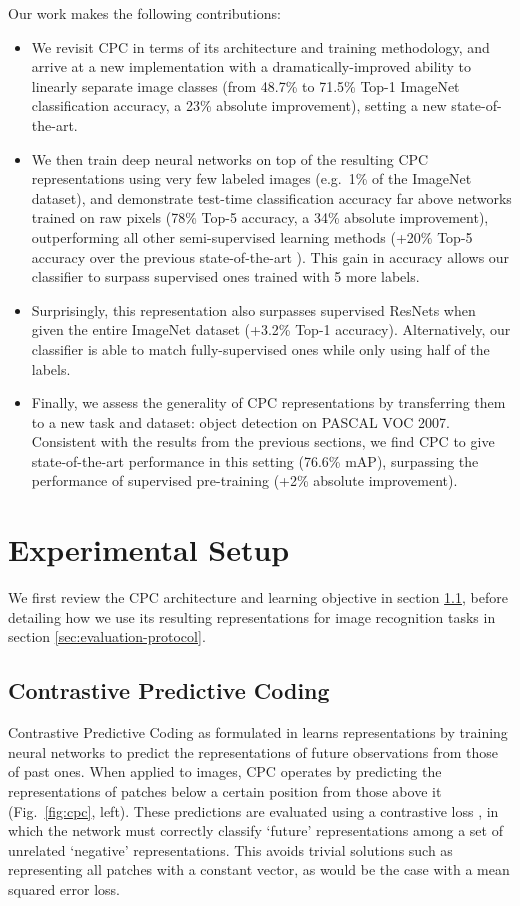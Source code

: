 \documentclass{article}
\begin{document}
Our work makes the following contributions:
\begin{itemize}
    \item We revisit CPC in terms of its architecture and training methodology, and arrive at a new implementation with a dramatically-improved ability to linearly separate image classes (from 48.7\% to 71.5\% Top-1 ImageNet classification accuracy, a 23\% absolute improvement), setting a new state-of-the-art. 
    \item We then train deep neural networks on top of the resulting CPC representations using very few labeled images (e.g.\ 1\% of the ImageNet dataset), and demonstrate test-time classification accuracy far above networks trained on raw pixels (78\% Top-5 accuracy, a 34\% absolute improvement), outperforming all other semi-supervised learning methods (+20\% Top-5 accuracy over the previous state-of-the-art \citep{zhai2019s}). This gain in accuracy allows our classifier to surpass supervised ones trained with 5 more labels. 
    \item Surprisingly, this representation also surpasses supervised ResNets when given the entire ImageNet dataset (+3.2\% Top-1 accuracy). Alternatively, our classifier is able to match fully-supervised ones while only using half of the labels.
    \item Finally, we assess the generality of CPC representations by transferring them to a new task and dataset: object detection on PASCAL VOC 2007. Consistent with the results from the previous sections, we find CPC to give state-of-the-art performance in this setting (76.6\% mAP), surpassing the performance of supervised pre-training (+2\% absolute improvement). 
\end{itemize}


\section{Experimental Setup}

We first review the CPC architecture and learning objective in section \ref{sec:cpc}, before detailing how we use its resulting representations for image recognition tasks in section \ref{sec:evaluation-protocol}. 

\subsection{Contrastive Predictive Coding}
\label{sec:cpc}

Contrastive Predictive Coding as formulated in \citep{oord2018representation} learns representations by training neural networks to predict the representations of future observations from those of past ones. When applied to images, CPC operates by predicting the representations of patches below a certain position from those above it (Fig.\ \ref{fig:cpc}, left). These predictions are evaluated using a contrastive loss \citep{chopra2005learning, hadsell2006dimensionality}, in which the network must correctly classify `future' representations among a set of unrelated `negative' representations. This avoids trivial solutions such as representing all patches with a constant vector, as would be the case with a mean squared error loss.
\end{document}
